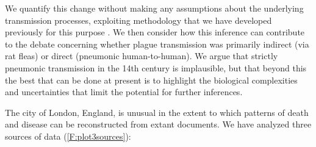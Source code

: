 We quantify this change without making any assumptions about the underlying transmission processes, exploiting methodology that we have developed previously for this purpose \cite{Ma+14}.  We then consider how this inference can contribute to the debate concerning whether plague transmission was primarily indirect (via rat fleas) or direct (pneumonic human-to-human).  We argue that strictly pneumonic transmission in the 14th century is implausible, but that beyond this the best that can be done at present is to highlight the biological complexities and uncertainties that limit the potential for further inferences.


The city of London, England, is unusual in the extent to which patterns of death and disease can be reconstructed from extant documents. We have analyzed three sources of data (\cref{F:plot3sources}):
